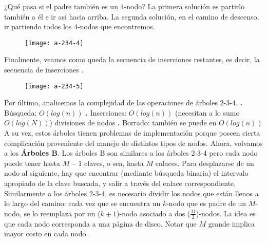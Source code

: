 \documentclass[10pt,a4paper]{article}
\begin{document}
¿Qué pasa si el padre también es un 4-nodo?
\newline
\newline
La primera solución es partirlo también a él e ir asi hacia arriba.
\newline
\newline
La segunda solución, en el camino de descenso, ir partiendo todos los 4-nodos que encontremos.
\newline
\newline
\begin{figure}[h]
	\centering
\texttt{[image: a-234-4]}
	\label{drivers1}
\end{figure}      
\newline
\newline
Finalmente, veamos como queda la secuencia de inserciones restantes, es decir, la secuencia de inserciones .
\newline
\newline
\begin{figure}[h]
	\centering
\texttt{[image: a-234-5]}
	\label{drivers1}
\end{figure}      
\newline
\newline
Por último, analicemos la complejidad de las operaciones de árboles 2-3-4.
\newline
\newline
\textbf{.} Búsqueda: $O(log(n))$
\newline
\newline
\textbf{.} Inserciones: $O(log(n))$ (necesitan a lo sumo $O(log(N))$) divisiones de nodos
\newline
\newline
\textbf{.} Borrado: también se puede en $O(log(n))$
\newline
\newline
A su vez, estos árboles tienen problemas de implementación porque poseen cierta complicación proveniente del manejo de distintos tipos de nodos.
\newpage
Ahora, volvamos a los \textbf{Árboles B}.
\newline
\newline
Los árboles B son similares a los árboles 2-3-4 pero cada nodo puede tener hasta $M-1$ claves, o sea, hasta $M$ enlaces.
\newline
\newline
Para desplazarse de un nodo al siguiente, hay que encontrar (mediante búsqueda binaria) el intervalo apropiado de la clave buscada, y salir a través del enlace correspondiente.
\newline
\newline
Similarmente a los árboles 2-3-4, es necesario dividir los nodos que están llenos a lo largo del camino: cada vez que se encuentra un $k$-nodo que es padre de un $M$-nodo, se lo reemplaza por un ($k+1$)-nodo asociado a dos ($\displaystyle \frac{M}{2}$)-nodos.
\newline
\newline
La idea es que cada nodo corresponda a una página de disco. Notar que $M$ grande implica mayor costo en cada nodo.
\end{document}

